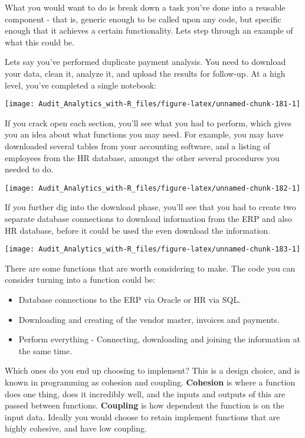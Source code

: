 \documentclass[
]{book}
\providecommand{\tightlist}{%
  \setlength{\itemsep}{0pt}\setlength{\parskip}{0pt}}
\begin{document}
What you would want to do is break down a task you've done into a reusable component - that is, generic enough to be called upon any code, but specific enough that it achieves a certain functionality. Lets step through an example of what this could be.

Lets say you've performed duplicate payment analysis. You need to download your data, clean it, analyze it, and upload the results for follow-up. At a high level, you've completed a single notebook:

\texttt{[image: Audit\_Analytics\_with-R\_files/figure-latex/unnamed-chunk-181-1]}

If you crack open each section, you'll see what you had to perform, which gives you an idea about what functions you may need. For example, you may have downloaded several tables from your accounting software, and a listing of employees from the HR database, amongst the other several procedures you needed to do.

\texttt{[image: Audit\_Analytics\_with-R\_files/figure-latex/unnamed-chunk-182-1]}

If you further dig into the download phase, you'll see that you had to create two separate database connections to download information from the ERP and also HR database, before it could be used the even download the information.

\texttt{[image: Audit\_Analytics\_with-R\_files/figure-latex/unnamed-chunk-183-1]}

There are some functions that are worth considering to make. The code you can consider turning into a function could be:

\begin{itemize}
\tightlist
\item
  Database connections to the ERP via Oracle or HR via SQL.
\item
  Downloading and creating of the vendor master, invoices and payments.
\item
  Perform everything - Connecting, downloading and joining the information at the same time.
\end{itemize}

Which ones do you end up choosing to implement? This is a design choice, and is known in programming as cohesion and coupling. \textbf{Cohesion} is where a function does one thing, does it incredibly well, and the inputs and outputs of this are passed between functions. \textbf{Coupling} is how dependent the function is on the input data. Ideally you would choose to retain implement functions that are highly cohesive, and have low coupling.
\end{document}
